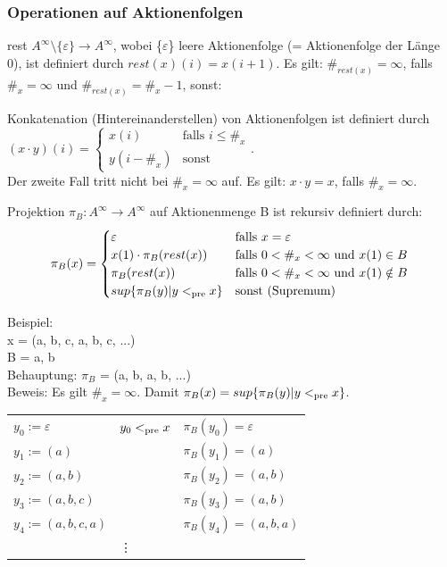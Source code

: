 \subsubsection*{Operationen auf Aktionenfolgen}
\begin{description}
	\item{rest} $A^\infty \setminus \{\varepsilon\} \rightarrow A^\infty$, wobei \{$\varepsilon$\} leere Aktionenfolge (= Aktionenfolge der Länge 0), ist definiert durch $rest(x)(i) = x(i+1)$. Es gilt: $\#_{rest(x)} = \infty$, falls $\#_x = \infty$ und $\#_{rest(x)} = \#_x - 1$, sonst:
	\item {Konkatenation (Hintereinanderstellen)} von Aktionenfolgen ist definiert durch \\
	$(x \cdot y)(i) =
	\begin{cases}
	x(i) & \text{falls } i \leq \#_x \\
	y(i-\#_x)& \text{sonst}
	\end{cases}$.\\
	Der zweite Fall tritt nicht bei $\#_x = \infty$ auf. Es gilt: $x \cdot y = x$, falls $\#_x = \infty$.\\
	\item{Projektion} $\pi_B : A^\infty \rightarrow A^\infty$ auf Aktionenmenge B ist rekursiv definiert durch:
\begin{equation*}
	\pi_B(x) = \begin{cases}
		\varepsilon &\text{falls $x = \varepsilon$} \\
		x(1)\cdot \pi_B(rest(x)) &\text{falls $0 < \#_x < \infty$ und $x(1) \in B $}\\
		\pi_B(rest(x)) &\text{falls $0 < \#_x < \infty$ und $x(1) \notin B$ }\\
		sup\{\pi_B(y) | y <_{\operatorname{pre}} x\} &\text{sonst (Supremum)}
	\end{cases}
\end{equation*}
\end{description}
Beispiel:\\
x = (a, b, c, a, b, c, ...)\\
B = {a, b}\\
Behauptung: $\pi_B$ = (a, b, a, b, ...)\\
Beweis: Es gilt $\#_x = \infty$. Damit $\pi_B(x) = sup\{\pi_B(y) | y <_{\operatorname{pre}} x\}$.
\begin{center}
\begin{tabular}{l l l}
$y_0 := \varepsilon$ & $y_0 <_{\operatorname{pre}} x$ & $\pi_B(y_0) = \varepsilon$\\
$y_1 := (a)$ & \ & $\pi_B(y_1) = (a)$\\
$y_2 := (a, b)$ & \ & $\pi_B(y_2) = (a, b)$\\
$y_3 := (a, b, c)$ & \ & $\pi_B(y_3) = (a, b)$\\
$y_4 := (a, b, c, a)$ & \ & $\pi_B(y_4) = (a, b, a)$\\
\ & \vdots & \
\end{tabular}
\end{center}
